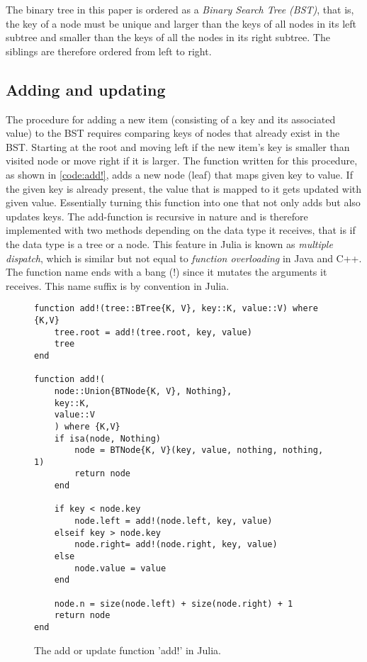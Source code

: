 \documentclass[a4paper, 11pt]{article}
\begin{document}
    The binary tree in this paper is ordered as a \emph{Binary Search Tree (BST)}, that is, 
    the key of a node must be unique and larger than the keys of all nodes in
    its left subtree and smaller than the keys of all the nodes in its right
    subtree. The siblings are therefore ordered from left to right.

    \clearpage
    \subsection*{Adding and updating}
    The procedure for adding a new item (consisting of a key and its associated value)
    to the BST requires comparing keys of
    nodes that already exist in the BST. Starting at the root and moving left
    if the new item's key is smaller than visited node or move right if it is larger. 
    The function written for this procedure, as shown in 
    \autoref{code:add!}, adds a new node (leaf) that maps
    given key to value. If the given key is already present, the value that is
    mapped to it gets updated with given value. Essentially turning this function into
    one that not only adds but also updates keys. 
    The add-function is recursive in nature and is therefore implemented with 
    two methods %
    depending on the data type it receives, 
    that is if the data type is a tree or a node. 
    This feature in Julia is known as \emph{multiple dispatch}, 
    which is similar but not equal to \emph{function overloading} in Java and C++. 
    The function name ends with a bang (!) since it mutates the arguments it receives. 
    This name suffix is by convention in Julia. 
    \begin{figure}[H]
        \centering
    \begin{verbatim}
function add!(tree::BTree{K, V}, key::K, value::V) where {K,V}
    tree.root = add!(tree.root, key, value)
    tree
end

function add!(
    node::Union{BTNode{K, V}, Nothing}, 
    key::K, 
    value::V
    ) where {K,V}
    if isa(node, Nothing)  
        node = BTNode{K, V}(key, value, nothing, nothing, 1)
        return node
    end

    if key < node.key
        node.left = add!(node.left, key, value)
    elseif key > node.key
        node.right= add!(node.right, key, value)
    else
        node.value = value
    end

    node.n = size(node.left) + size(node.right) + 1
    return node
end
    \end{verbatim}
    \caption{The add or update function 'add!' in Julia.}
    \label{code:add!}
    \end{figure}
\end{document}
